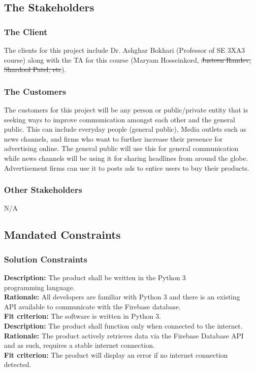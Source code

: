 \documentclass[12pt, titlepage]{article}
\begin{document}
\subsection{The Stakeholders}

\subsubsection{The Client}
The clients for this project include Dr. Ashghar Bokhari (Professor of SE 3XA3 course) along with the TA for this course (Maryam Hosseinkord, \sout{Justeen Randev, Shardool Patel, etc}).

\subsubsection{The Customers}
The customers for this project will be any person or public/private entity that is seeking ways to improve communication amongst each other and the general public. This can include everyday people (general public), Media outlets such as news channels, and firms who want to further increase their presence for advertising online. The general public will use this for general communication while news channels will be using it for sharing headlines from around the globe. Advertisement firms can use it to posts ads to entice users to buy their products. 

\subsubsection{Other Stakeholders}
N/A

\subsection{Mandated Constraints}
\subsubsection{Solution Constraints}
\textbf{Description:} The product shall be written in the Python 3\\ programming language.\\
\textbf{Rationale:} All developers are familiar with Python 3 and there is an existing API available to communicate with the Firebase database.\\
\textbf{Fit criterion:} The software is written in Python 3.\\

\textbf{Description:} The product shall function only when connected to the internet.\\
\textbf{Rationale:} The product actively retrieves data via the Firebase Database API and as such, requires a stable internet connection.\\
\textbf{Fit criterion:} The product will display an error if no internet connection detected.\\
\end{document}

